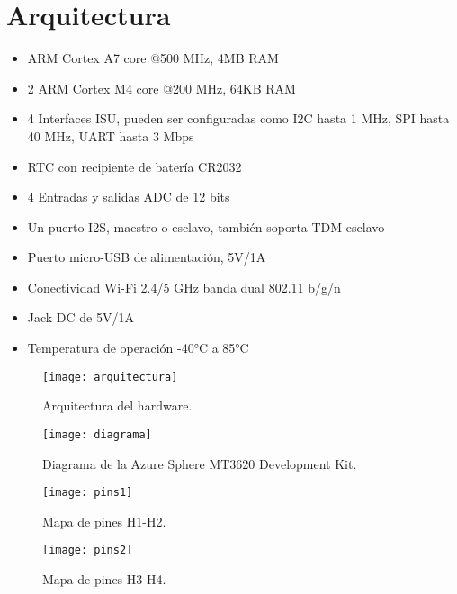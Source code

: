 \section{Arquitectura}
\begin{itemize}
	\item
	ARM Cortex A7 core @500 MHz, 4MB RAM
	\item
	2 ARM Cortex M4 core @200 MHz, 64KB RAM
	\item
	4 Interfaces ISU, pueden ser configuradas como I2C hasta 1 MHz, SPI hasta 40 MHz, UART hasta 3 Mbps
	\item
	RTC con recipiente de batería CR2032
	\item
	4 Entradas y salidas ADC de 12 bits
	\item
	Un puerto I2S, maestro o esclavo, también soporta TDM esclavo
	\item
	Puerto micro-USB de alimentación, 5V/1A
	\item
	Conectividad Wi-Fi 2.4/5 GHz banda dual 802.11 b/g/n
	\item
	Jack DC de 5V/1A
	\item
	Temperatura de operación -40°C a 85°C
\end{itemize}	

\begin{figure}[h]
	\centering
	\texttt{[image: arquitectura]}
	\caption{Arquitectura del hardware.}
\end{figure}

\begin{figure}[h]
	\centering
	\texttt{[image: diagrama]}
	\caption{Diagrama de la Azure Sphere MT3620 Development Kit.}
\end{figure}

\begin{figure}[h]
	\centering
	\texttt{[image: pins1]}
	\caption{Mapa de pines H1-H2.}
\end{figure}

\begin{figure}[h]
	\centering
	\texttt{[image: pins2]}
	\caption{Mapa de pines H3-H4.}
\end{figure}